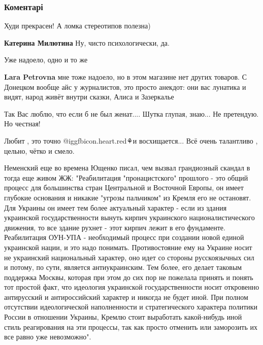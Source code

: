  
 
 
 
 
\subsubsection{Коментарі}

\begin{itemize} %
Худи прекрасен! А ломка стереотипов полезна)

\begin{itemize} %
\textbf{Катерина Милютина} Ну, чисто психологически, да.
\end{itemize} %

Уже надоело, одно и то же

\begin{itemize} %
\textbf{Lara Petrovna} мне тоже надоело, но в этом магазине нет других товаров. С Донецком вообще айс у журналистов, это просто анекдот: они вас лунатика и видят, народ живёт внутри сказки, Алиса и Зазеркалье
\end{itemize} %

Так Вас люблю, что если б не был женат....
Шутка глупая, знаю... Не претендую. Но честная!

Любит , это точно
@igg{fbicon.heart.red}⚘и восхищается...
Всё очень талантливо , цельно, чётко и смело.


Неменский еще во времена Ющенко писал, чем вызвал грандиозный скандал в тогда
еще живом ЖЖ: "Реабилитация "пронацистского" прошлого - это общий процесс для
большинства стран Центральной и Восточной Европы, он имеет глубокие основания и
никакие "угрозы пальчиком" из Кремля его не остановят. Для Украины он имеет тем
более актуальный характер - если из здания украинской государственности вынуть
кирпич украинского националистического движения, то все здание рухнет - этот
кирпич лежит в его фундаменте. Реабилитация ОУН-УПА - необходимый процесс при
создании новой единой украинской нации, и это надо понимать. Противостояние ему
на Украине носит не украинский национальный характер, оно идет со стороны
русскоязычных сил и потому, по сути, является антиукраинским. Тем более, его
делает таковым поддержка Москвы, которая при этом до сих пор не пожелала
принять и понять тот простой факт, что идеология украинской государственности
носит откровенно антирусский и антироссийский характер и никогда не будет иной.
При полном отсутствии идеологической наполненности и стратегического характера
политики России в отношении Украины, Кремлю стоит выработать какой-нибудь иной
стиль реагирования на эти процессы, так как просто отменить или заморозить их
все равно уже невозможно".


\end{itemize}
